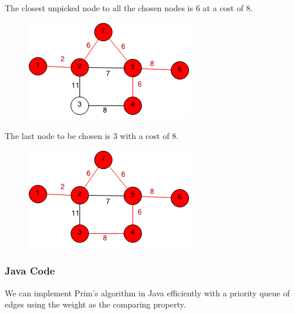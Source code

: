 \documentclass[11pt,oneside]{book}
\makeatletter
\def\maxwidth#1{\ifdim\Gin@nat@width>#1 #1\else\Gin@nat@width\fi}
\makeatother
\begin{document}
The closest unpicked node to all the chosen nodes is 6 at a cost of 8.
\vspace{5px}\begin{figure}[H]\centering
        \includegraphics[width=0.66\maxwidth{\textwidth}]{prim6.png}
        \end{figure}

The last node to be chosen is 3 with a cost of 8.

\vspace{5px}\begin{figure}[H]\centering
        \includegraphics[width=0.66\maxwidth{\textwidth}]{prim7.png}
        \end{figure}

\subsubsection{Java Code}

We can implement Prim's algorithm in Java efficiently with a priority queue of edges using the weight as the comparing property.
\end{document}
